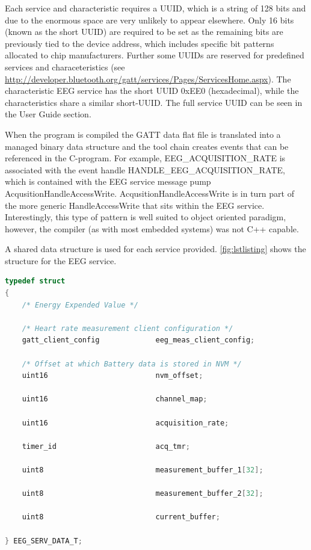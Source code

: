\documentclass[]{article}
\begin{document}
Each service and characteristic requires a \ac{UUID}, which is a string of 128 bits and due to the enormous space are very unlikely to appear elsewhere. Only 16 bits (known as the short \ac{UUID}) are required to be set as the remaining bits are previously tied to the device address, which includes specific bit patterns allocated to chip manufacturers. Further some \ac{UUID}s are reserved for predefined services and characeteristics (see \url{http://developer.bluetooth.org/gatt/services/Pages/ServicesHome.aspx}). The characteristic \ac{EEG} service has the short \ac{UUID} 0xEE0 (hexadecimal), while the characteristics share a similar short-UUID. The full service UUID can be seen in the User Guide section. 

When the program is compiled the GATT data flat file is translated into a managed binary data structure and the tool chain creates events that can be referenced in the C-program. For example, EEG\_ACQUISITION\_RATE is associated with the event handle HANDLE\_EEG\_ACQUISITION\_RATE, which is contained with the EEG service message pump AcqusitionHandleAccessWrite. AcqusitionHandleAccessWrite is in turn part of the more generic HandleAccessWrite that sits within the EEG service. Interestingly, this type of pattern is well suited to object oriented paradigm, however, the compiler (as with most embedded systems) was not C++ capable. 

A shared data structure is used for each service provided. \ref{fig:lstlisting} shows the structure for the \ac{EEG} service. 

\begin{lstlisting}[language=C, caption=\ac{EEG} data structure,label={lst:eegstruct}]
typedef struct
{
    /* Energy Expended Value */

    /* Heart rate measurement client configuration */
    gatt_client_config             eeg_meas_client_config; 

    /* Offset at which Battery data is stored in NVM */
    uint16                         nvm_offset;
    
    uint16                         channel_map; 
    
    uint16                         acquisition_rate;
    
    timer_id                       acq_tmr;
    
    uint8                          measurement_buffer_1[32];
   
    uint8                          measurement_buffer_2[32];
    
    uint8                          current_buffer;

} EEG_SERV_DATA_T;
\end{lstlisting}
\end{document}
